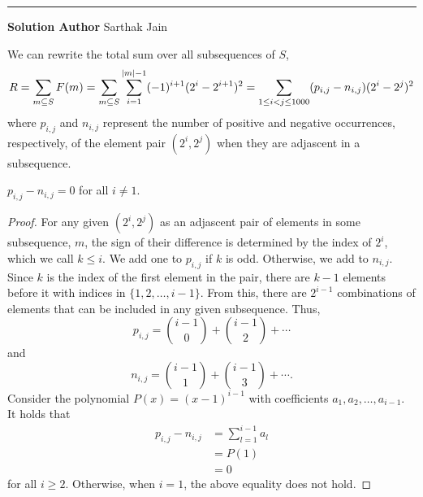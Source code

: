 \documentclass[11pt]{scrartcl}
\newcommand*{\problemfont}{\sffamily\bfseries}
\begin{document}
\vspace{-\baselineskip}\rule{\textwidth}{0.4pt}

{\problemfont Solution Author} Sarthak Jain

We can rewrite the total sum over all subsequences of $S$,  
\[R = \sum_{m\subseteq S}F(m) = \sum_{m\subseteq S}\sum_{i=1}^{\left\lvert m \right\rvert - 1}(-1)^{i+1}(2^{i} - 2^{i + 1})^2 = \sum_{1\leq i < j \leq 1000} (p_{i,j}-n_{i,j})(2^{i} - 2^{j})^2\]
where $p_{i,j}$ and $n_{i,j}$ represent the number of positive and negative occurrences, respectively, of the element pair $(2^{i},2^{j})$ when they are adjascent in a subsequence.

\begin{claim*}
    $p_{i,j}-n_{i,j} = 0$ for all $i \neq 1$.
\end{claim*}
\begin{proof}
    For any given $(2^{i},2^{j})$ as an adjascent pair of elements in some subsequence, $m$, the sign of their difference is determined by the index of $2^{i}$, which we call $k \leq i$. We add one to $p_{i,j}$ if $k$ is odd. Otherwise, we add to $n_{i,j}$. Since $k$ is the index of the first element in the pair, there are $k-1$ elements before it with indices in $\{1, 2, \dots, i - 1\}$. From this, there are $2^{i - 1}$ combinations of elements that can be included in any given subsequence. Thus,
    \[p_{i,j} = {i - 1 \choose 0} + {i - 1 \choose 2} + \cdots\]
    and
    \[n_{i,j} = {i - 1 \choose 1} + {i - 1 \choose 3} + \cdots.\]
    Consider the polynomial $P(x) = (x - 1)^{i - 1}$ with coefficients $a_{1}, a_{2}, \dots, a_{i - 1}$. It holds that
    \begin{align*}
        p_{i,j} - n_{i,j} &= \sum_{l = 1}^{i - 1} a_{l} \\
        &= P(1) \\
        &= 0
    \end{align*}
    for all $i \geq 2$. Otherwise, when $i = 1$, the above equality does not hold.
\end{proof}
\end{document}
